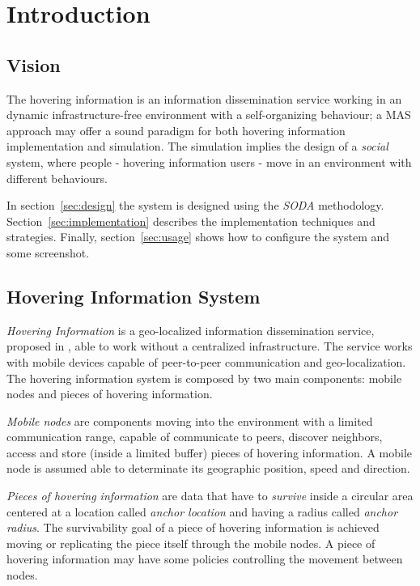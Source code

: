 \section{Introduction}

\subsection{Vision}

The hovering information is an information dissemination service working in an
dynamic infrastructure-free environment with a self-organizing behaviour; a MAS\cite{OEOP,epmas}
approach may offer a sound paradigm for both hovering information
implementation and simulation. The simulation implies the design of a
\emph{social} system, where people - hovering information users - move in an
environment with different behaviours.

In section~\ref{sec:design} the system is designed using the \emph{SODA}\cite{soda}
methodology. Section~\ref{sec:implementation} describes the implementation
techniques and strategies. Finally, section~\ref{sec:usage} shows how to
configure the system and some screenshot.

\subsection{Hovering Information System}

\emph{Hovering Information} is a geo-localized information dissemination
service, proposed in \cite{hover}, able to work without a centralized
infrastructure. The service works with mobile devices capable of peer-to-peer
communication and geo-localization. The hovering information system is composed
by two main components: mobile nodes and pieces of hovering information.

\emph{Mobile nodes} are components moving into the environment with a limited
communication range, capable of communicate to peers, discover neighbors,
access and store (inside a limited buffer) pieces of hovering information. A
mobile node is assumed able to determinate its geographic position, speed and
direction.

\emph{Pieces of hovering information} are data that have to \emph{survive}
inside a circular area centered at a location called \emph{anchor location} and
having a radius called \emph{anchor radius}. The survivability goal of a piece
of hovering information is achieved moving or replicating the piece itself
through the mobile nodes. A piece of hovering information may have some
policies controlling the movement between nodes.

